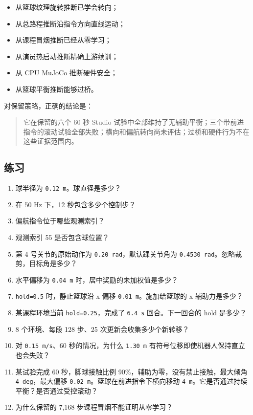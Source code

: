\documentclass[
  chinese,
  11pt,
  letterpaper,
]{article}
\providecommand{\tightlist}{%
  \setlength{\itemsep}{0pt}\setlength{\parskip}{0pt}}
\begin{document}
\begin{itemize}
\tightlist
\item
  从篮球纹理旋转推断已学会转向；
\item
  从总路程推断沿指令方向直线运动；
\item
  从课程冒烟推断已经从零学习；
\item
  从演员热启动推断精确上游续训；
\item
  从 CPU MuJoCo 推断硬件安全；
\item
  从篮球平衡推断能够过桥。
\end{itemize}

对保留策略，正确的结论是：

\begin{quote}
它在保留的六个 60 秒 Studio
试验中全部维持了无辅助平衡；三个带前进指令的滚动试验全部失败；横向和偏航转向尚未评估；过桥和硬件行为不在这些证据范围内。
\end{quote}

\subsection{练习}\label{ux7ec3ux4e60-1}

\begin{enumerate}
\def\labelenumi{\arabic{enumi}.}
\tightlist
\item
  球半径为 \texttt{0.12\ m}。球直径是多少？
\item
  在 50 Hz 下，12 秒包含多少个控制步？
\item
  偏航指令位于哪些观测索引？
\item
  观测索引 55 是否包含球位置？
\item
  第 4 号关节的原始动作为 \texttt{0.20\ rad}，默认踝关节角为
  \texttt{0.4530\ rad}。忽略裁剪，目标角是多少？
\item
  水平偏移为 \texttt{0.04\ m} 时，居中奖励的未加权值是多少？
\item
  \texttt{hold=0.5} 时，静止篮球沿 x 偏移 \texttt{0.01\ m}。施加给篮球的
  x 辅助力是多少？
\item
  某课程环境当前 \texttt{hold=0.25}，完成了 \texttt{6.4\ s}
  回合。下一回合的 hold 是多少？
\item
  8 个环境、每段 128 步、25 次更新会收集多少个新转移？
\item
  对 \texttt{0.15\ m/s}、60 秒的情况，为什么 \texttt{1.30\ m}
  有符号位移即使机器人保持直立也会失败？
\item
  某试验完成 60 秒，脚球接触比例 90\%，辅助为零，没有禁止接触，最大倾角
  \texttt{4\ deg}，最大偏移 \texttt{0.02\ m}。篮球在前进指令下横向移动
  \texttt{4\ m}。它是否通过持续平衡？是否通过受控滚动？
\item
  为什么保留的 7,168 步课程冒烟不能证明从零学习？
\end{enumerate}
\end{document}
